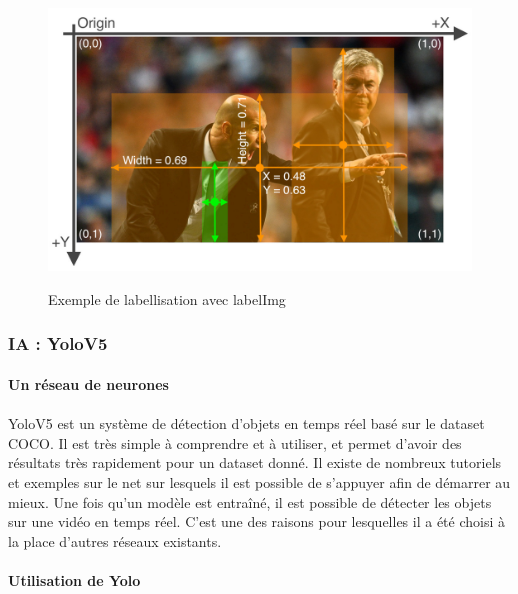        \begin{figure}[H]
            \centering
        	\begin{frame}{\includegraphics[width=1\textwidth]{image/exempleImgYolo.png}}
        	\end{frame}
        	\caption{\label{fig:zidane}Exemple de labellisation avec labelImg}
        \end{figure}
    
    \subsubsection{IA : YoloV5}
    \label{part:yolo}
        \paragraph{Un réseau de neurones}
            \paragraph*{}
            YoloV5 est un système de détection d'objets en temps réel basé sur le dataset COCO. Il est très simple à comprendre et à utiliser, et permet d'avoir des résultats très rapidement pour un dataset donné. Il existe de nombreux tutoriels et exemples sur le net sur lesquels il est possible de s'appuyer afin de démarrer au mieux. Une fois qu'un modèle est entraîné, il est possible de détecter les objets sur une vidéo en temps réel. C'est une des raisons pour lesquelles il a été choisi à la place d'autres réseaux existants.
        
        \paragraph{Utilisation de Yolo}
